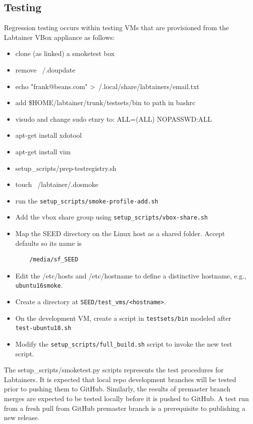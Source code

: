 \documentclass[12pt]{article}
\begin{document}
\subsection{Testing}
Regression testing occurs within testing VMs that are provisioned from the Labtainer VBox appliance as follows:
\begin{itemize}
\item clone (as linked) a smoketest box
\item remove ~/.doupdate
\item echo "frank@beans.com" \textgreater ~/.local/share/labtainers/email.txt
\item add \$HOME/labtainer/trunk/testsets/bin to path in bashrc
\item visudo and change sudo etnry to: ALL=(ALL) NOPASSWD:ALL
\item apt-get install xdotool
\item apt-get install vim
\item setup\_scripts/prep-testregistry.sh
\item touch ~/labtainer/.dosmoke
\item run the {\tt setup\_scripts/smoke-profile-add.sh}
\item Add the vbox share group using {\tt setup\_scripts/vbox-share.sh} 
\item Map the SEED directory on the Linux host as a shared folder. Accept defaults so its name is 
\begin{verbatim}
    /media/sf_SEED
\end{verbatim}
\item Edit the /etc/hosts and /etc/hostname to define a distinctive hostname, e.g., {\tt ubuntu16smoke}.
\item Create a directory at {\tt SEED/test\_vms/<hostname>}.  
\item On the development VM, create a script in {\tt testsets/bin} modeled after {\tt test-ubuntu18.sh}
\item Modify the {\tt setup\_scripts/full\_build.sh} script to invoke the new test script.
\end{itemize}


The {setup\_scripts/smoketest.py} scripts represents the test procedures for Labtainers.  
It is expected that local repo development branches will be tested prior to pushing them to GitHub.  Similarly, the
results of premaster branch merges are expected to be tested locally before it is pushed to GitHub. A test run
from a fresh pull from GitHub premaster branch is a prerequisite to publishing a new release.
\end{document}
